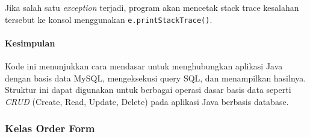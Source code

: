 Jika salah satu \textit{exception} terjadi, program akan mencetak stack trace kesalahan tersebut ke konsol menggunakan \texttt{e.printStackTrace()}.

\paragraph{Kesimpulan}
Kode ini menunjukkan cara mendasar untuk menghubungkan aplikasi Java dengan basis data MySQL, mengeksekusi query SQL, dan menampilkan hasilnya. Struktur ini dapat digunakan untuk berbagai operasi dasar basis data seperti \textit{CRUD} (Create, Read, Update, Delete) pada aplikasi Java berbasis database.

\subsubsection{Kelas Order Form}

